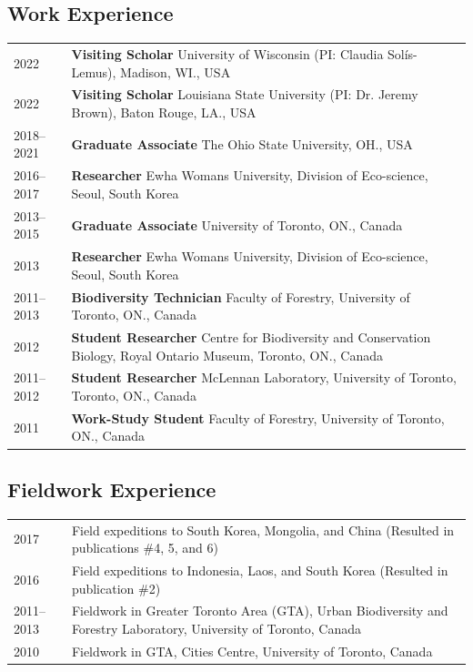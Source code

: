 \documentclass[11pt]{article}
\begin{document}
\subsection*{Work Experience}
\begin{longtable}{p{}  p{}}
2022		   & \textbf{Visiting Scholar} University of Wisconsin (PI: Claudia Solís-Lemus), Madison, WI., USA\color{red}{$>>>$Coming soon!}\\
2022		   & \textbf{Visiting Scholar} Louisiana State University (PI: Dr. Jeremy Brown), Baton Rouge, LA., USA\\
2018--2021 & \textbf{Graduate Associate} The Ohio State University, OH., USA\\
2016--2017 & \textbf{Researcher} Ewha Womans University, Division of Eco-science, Seoul, South Korea\\%
2013--2015 & \textbf{Graduate Associate} University of Toronto, ON., Canada\\
2013 &	\textbf{Researcher} Ewha Womans University, Division of Eco-science, Seoul, South Korea\\%
2011--2013 &	\textbf{Biodiversity Technician} Faculty of Forestry, University of Toronto, ON., Canada\\%
2012 &	\textbf{Student Researcher} Centre for Biodiversity and Conservation Biology, Royal Ontario Museum, Toronto, ON., Canada\\
2011--2012 &	\textbf{Student Researcher} McLennan Laboratory, University of Toronto, Toronto, ON., Canada\\
2011&	\textbf{Work-Study Student} Faculty of Forestry, University of Toronto, ON., Canada\vspace{5pt}\\%
\end{longtable}


\subsection*{Fieldwork Experience}
\begin{longtable}{p{}  p{}}
2017 & Field expeditions to South Korea, Mongolia, and China (Resulted in publications \#4, 5, and 6)\\
2016 & Field expeditions to Indonesia, Laos, and South Korea (Resulted in publication \#2)\\
2011--2013 & Fieldwork in Greater Toronto Area (GTA), Urban Biodiversity and Forestry Laboratory, University of Toronto, Canada\\
2010 & Fieldwork in GTA, Cities Centre, University of Toronto, Canada\vspace{5pt}\\%
\end{longtable}
\end{document}
